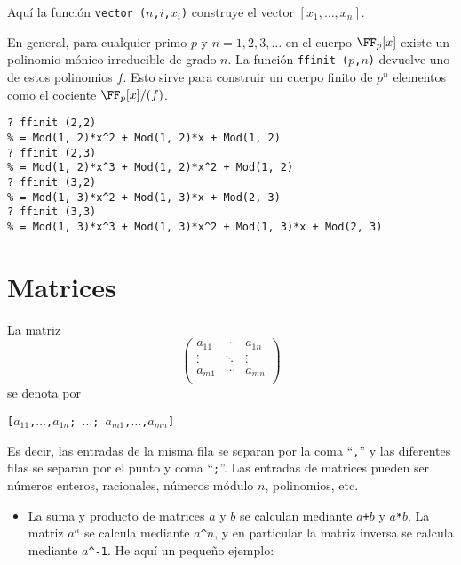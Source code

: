 Aquí la función \texttt{vector\,($n$,$i$,$x_i$)} construye el vector
$[x_1,\ldots,x_n]$.

\vspace{1em}

En general, para cualquier primo $p$ y $n = 1,2,3,\ldots$ en el cuerpo
$\FF_p [x]$ existe un polinomio mónico irreducible de grado $n$. La función
\texttt{ffinit\,($p$,$n$)} devuelve uno de estos polinomios $f$. Esto sirve para
construir un cuerpo finito de $p^n$ elementos como el cociente $\FF_p [x]/(f)$.

\begin{framed}\footnotesize
\begin{verbatim}
? ffinit (2,2)
% = Mod(1, 2)*x^2 + Mod(1, 2)*x + Mod(1, 2)
? ffinit (2,3)
% = Mod(1, 2)*x^3 + Mod(1, 2)*x^2 + Mod(1, 2)
? ffinit (3,2)
% = Mod(1, 3)*x^2 + Mod(1, 3)*x + Mod(2, 3)
? ffinit (3,3)
% = Mod(1, 3)*x^3 + Mod(1, 3)*x^2 + Mod(1, 3)*x + Mod(2, 3)
\end{verbatim}
\end{framed}


\section{Matrices}

La matriz
\[ \begin{pmatrix}
    a_{11} & \cdots & a_{1n} \\
    \vdots & \ddots & \vdots \\
    a_{m1} & \cdots & a_{mn} \\
  \end{pmatrix} \]
se denota por
\begin{center}
  \texttt{[$a_{11}$,$\ldots$,$a_{1n}$; $\ldots$; $a_{m1}$,$\ldots$,$a_{mn}$]}
\end{center}
Es decir, las entradas de la misma fila se separan por la coma ``\texttt{,}'' y
las diferentes filas se separan por el punto y coma ``\texttt{;}''. Las entradas
de matrices pueden ser números enteros, racionales, números módulo $n$,
polinomios, etc.

\begin{itemize}
\item La suma y producto de matrices $a$ y $b$ se calculan mediante
  \texttt{$a$+$b$} y \texttt{$a$*$b$}. La matriz $a^n$ se calcula mediante
  \texttt{$a$\^{}$n$}, y en particular la matriz inversa se calcula mediante
  \texttt{$a$\^{}-1}. He aquí un pequeño ejemplo:
\end{itemize}

